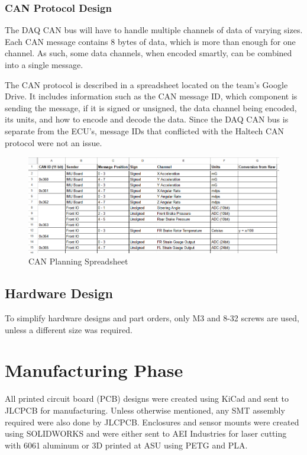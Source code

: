 \subsubsection{CAN Protocol Design}
The DAQ CAN bus will have to handle multiple channels of data of varying sizes.
Each CAN message contains 8 bytes of data, which is more than enough for one channel.
As such, some data channels, when encoded smartly, can be combined into a single message.
\vspace{1em}

The CAN protocol is described in a spreadsheet located on the team's Google Drive.
It includes information such as the CAN message ID, which component is sending the message, if it is signed or unsigned, the data channel being encoded, its units, and how to encode and decode the data.
Since the DAQ CAN bus is separate from the ECU's, message IDs that conflicted with the Haltech CAN protocol were not an issue.
\begin{figure}[H]
        \centering
        \includegraphics[width=6.5in]{images/canplanning.png}
        \caption{CAN Planning Spreadsheet}
        \label{fig:cpslol}
\end{figure}
\subsection{Hardware Design}
To simplify hardware designs and part orders, only M3 and 8-32 screws are used, unless a different size was required.


\section{Manufacturing Phase}
All printed circuit board (PCB) designs were created using KiCad and sent to JLCPCB for manufacturing.
Unless otherwise mentioned, any SMT assembly required were also done by JLCPCB.
Enclosures and sensor mounts were created using SOLIDWORKS and were either sent to AEI Industries for laser cutting with 6061 aluminum or 3D printed at ASU using PETG and PLA.

